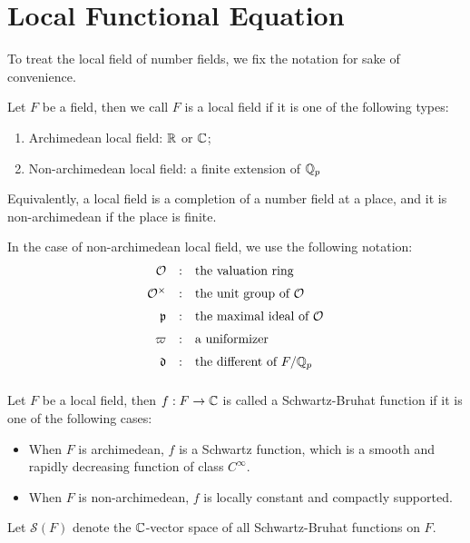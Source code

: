 \section{Local Functional Equation}

To treat the local field of number fields, we fix the notation for sake of convenience.

\begin{definition}
    Let \(F\) be a field, then we call \(F\) is a local field if it is one of the following types:
    \begin{enumerate}
        \item Archimedean local field: \(\mathbb{R}\) or \(\mathbb{C}\); 
        \item Non-archimedean local field: a finite extension of \(\mathbb{Q}_p\)
    \end{enumerate} 
    Equivalently, a local field is a completion of a number field at a place, and it is non-archimedean if the place is finite.
\end{definition}

In the case of non-archimedean local field, we use the following notation:
\[
\begin{array}{rcl}
\mathcal O &:& \text{the valuation ring} \\[6pt]
\mathcal O^\times &:& \text{the unit group of } \mathcal O \\[6pt]
\mathfrak p &:& \text{the maximal ideal of } \mathcal O \\[6pt]
\varpi &:& \text{a uniformizer} \\[6pt]
\mathfrak{d} &:& \text{the different of  } F/\mathbb{Q}_p\\[6pt]


\end{array}
\]

\begin{definition}
    Let \(F\) be a local field, then \(f: F \to \mathbb{C}\) is called a Schwartz-Bruhat function if it is one of the following cases:
    \begin{itemize}
        \item When \(F\) is archimedean, \(f\) is a Schwartz function, which is a smooth and rapidly decreasing function of class \(C^{\infty}\).
        \item When \(F\) is non-archimedean, \(f\) is locally constant and compactly supported.
    \end{itemize}
    Let \(\mathcal{S}(F)\) denote the \(\mathbb{C}\)-vector space of all Schwartz-Bruhat functions on \(F\).
\end{definition}


